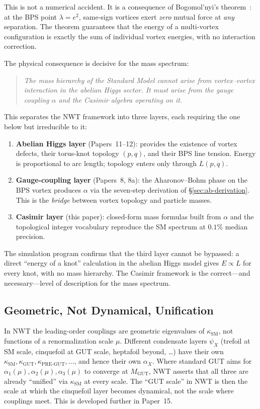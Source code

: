 \documentclass[11pt]{article}
\newcommand{\ksm}{\kappa_\text{SM}}
\newcommand{\kgut}{\kappa_\text{GUT}}
\begin{document}
This is not a numerical accident.  It is a consequence of
Bogomol'nyi's theorem~\cite{Bogomolny1976}: at the BPS point
$\lambda = e^2$, same-sign vortices exert \emph{zero} mutual
force at \emph{any} separation.  The theorem guarantees that the
energy of a multi-vortex configuration is exactly the sum of
individual vortex energies, with no interaction correction.

The physical consequence is decisive for the mass spectrum:
\begin{quote}
  \emph{The mass hierarchy of the Standard Model cannot arise from
  vortex--vortex interaction in the abelian Higgs sector.  It must
  arise from the gauge coupling $\alpha$ and the Casimir algebra
  operating on it.}
\end{quote}
This separates the NWT framework into three layers, each requiring
the one below but irreducible to it:
\begin{enumerate}
  \item \textbf{Abelian Higgs layer} (Papers~11--12): provides the
        existence of vortex defects, their torus-knot topology
        $(p,q)$, and their BPS line tension.  Energy is proportional
        to arc length; topology enters only through $L(p,q)$.
  \item \textbf{Gauge-coupling layer} (Papers~8, 8a): the
        Aharonov--Bohm phase on the BPS vortex produces $\alpha$
        via the seven-step derivation of
        \S\ref{sec:ab-derivation}.  This is the \emph{bridge}
        between vortex topology and particle masses.
  \item \textbf{Casimir layer} (this paper): closed-form mass
        formulas built from $\alpha$ and the topological integer
        vocabulary reproduce the SM spectrum at $0.1\%$ median
        precision.
\end{enumerate}
The simulation program confirms that the third layer cannot be
bypassed: a direct ``energy of a knot'' calculation in the abelian
Higgs model gives $E \propto L$ for every knot, with no mass
hierarchy.  The Casimir framework is the correct---and
necessary---level of description for the mass spectrum.

\subsection{Geometric, Not Dynamical, Unification}

In NWT the leading-order couplings are geometric eigenvalues
of $\ksm$, not functions of a renormalization scale $\mu$.
Different condensate layers $\psi_X$ (trefoil at SM scale,
cinquefoil at GUT scale, heptafoil beyond, \ldots) have their own
$\ksm, \kgut, \kappa_\text{PRE-GUT}, \ldots$, and hence their own
$\alpha_X$.  Where standard GUT aims for $\alpha_1(\mu),
\alpha_2(\mu), \alpha_3(\mu)$ to converge at $M_\text{GUT}$, NWT
asserts that all three are already ``unified'' via $\ksm$ at every
scale.  The ``GUT scale'' in NWT is then the scale at which the
cinquefoil layer becomes dynamical, not the scale where couplings
meet.  This is developed further in Paper~15.
\end{document}
